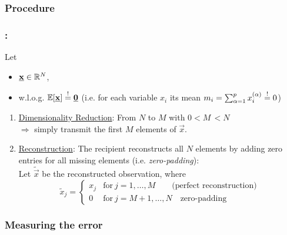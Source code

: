 \subsubsection{Procedure}

\begin{frame}\frametitle{\subsecname:~\subsubsecname}

Let
\slidesonly{\vspace{-5mm}}
\begin{itemize}
\item[]$\underline{\mathbf{x}} \in \mathbb{R}^N$,\\
\item[] w.l.o.g. $\mathbb{E}[\underline{\mathbf{x}}] \stackrel{\mathrm{!}}{=} \underline{\mathbf{0}}$ \notesonly{\\

}(i.e. for each variable $x_i$ its mean $m_i = \sum_{\alpha=1}^{p} x_i^{(\alpha)} \stackrel{\mathrm{!}}{=} 0$)
\end{itemize}

\pause

\begin{enumerate}
\item \underline{Dimensionality Reduction}: From $N$ to $M$ with $0 < M\, < N$\\
$\Rightarrow$ simply transmit the first $M$ elements of $\vec x$. 
\pause
\item \underline{Reconstruction}: The recipient reconstructs all $N$ elements by adding zero entries for all missing elements (i.e. \textit{zero-padding}):\\
Let $\widetilde{\vec{x}}$ be the reconstructed observation, where\\ 
 
 \begin{equation}
 \widetilde{x}_j = \begin{cases} 
      {x}_j & \text{for}~j=1,\ldots,M \qquad \text{(perfect reconstruction)} \\
      0 & \text{for}~j=M+1,\ldots,N \quad \text{zero-padding} 
   \end{cases}
 \end{equation}
\end{enumerate}


\end{frame}

\subsubsection{Measuring the error}\label{sec:objective}

